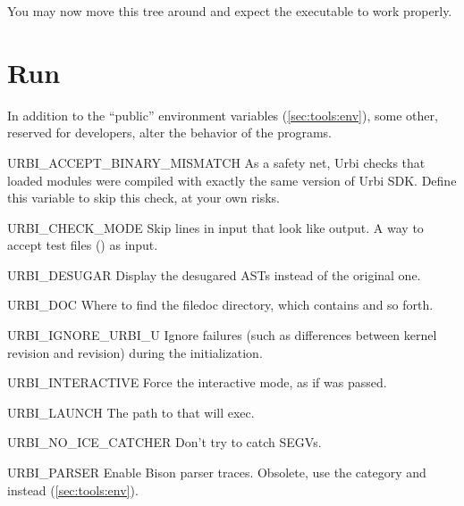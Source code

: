 
You may now move this tree around and expect the executable to work
properly.

\section{Run}
\label{sec:build:run}

In addition to the ``public'' environment variables
(\autoref{sec:tools:env}), some other, reserved for developers, alter the
behavior of the programs.

\begin{envs}
\item[URBI\_ACCEPT\_BINARY\_MISMATCH] As a safety net, Urbi checks that
  loaded modules were compiled with exactly the same version of Urbi SDK.
  Define this variable to skip this check, at your own risks.

\item[URBI\_CHECK\_MODE] Skip lines in input that look like \urbi output.  A
  way to accept test files () as input.

\item[URBI\_DESUGAR] Display the desugared ASTs instead of the
  original one.

\item[URBI\_DOC] Where to find the file{doc} directory, which contains
   and so forth.

\item[URBI\_IGNORE\_URBI\_U] Ignore failures (such as differences between
  kernel revision and  revision) during the initialization.

\item[URBI\_INTERACTIVE] Force the interactive mode, as if
   was passed.

\item[URBI\_LAUNCH] The path to  that
   will exec.

\item[URBI\_NO\_ICE\_CATCHER] Don't try to catch SEGVs.

\item[URBI\_PARSER] Enable Bison parser traces.  Obsolete, use the
   category and  instead
  (\autoref{sec:tools:env}).


\end{envs}
